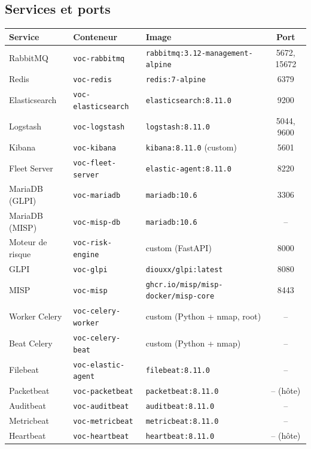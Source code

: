 \documentclass[11pt,a4paper]{article}
\begin{document}
\subsection{Services et ports}

\begin{center}
\small
\begin{longtable}{@{}l l l c@{}}
\toprule
\textbf{Service} & \textbf{Conteneur} & \textbf{Image} & \textbf{Port} \\
\midrule
\endhead
\bottomrule
\endlastfoot
RabbitMQ & \texttt{voc-rabbitmq} & \texttt{rabbitmq:3.12-management-alpine} & 5672, 15672 \\
Redis & \texttt{voc-redis} & \texttt{redis:7-alpine} & 6379 \\
Elasticsearch & \texttt{voc-elasticsearch} & \texttt{elasticsearch:8.11.0} & 9200 \\
Logstash & \texttt{voc-logstash} & \texttt{logstash:8.11.0} & 5044, 9600 \\
Kibana & \texttt{voc-kibana} & \texttt{kibana:8.11.0} (custom) & 5601 \\
Fleet Server & \texttt{voc-fleet-server} & \texttt{elastic-agent:8.11.0} & 8220 \\
MariaDB (GLPI) & \texttt{voc-mariadb} & \texttt{mariadb:10.6} & 3306 \\
MariaDB (MISP) & \texttt{voc-misp-db} & \texttt{mariadb:10.6} & -- \\
Moteur de risque & \texttt{voc-risk-engine} & custom (FastAPI) & 8000 \\
GLPI & \texttt{voc-glpi} & \texttt{diouxx/glpi:latest} & 8080 \\
MISP & \texttt{voc-misp} & \texttt{ghcr.io/misp/misp-docker/misp-core} & 8443 \\
Worker Celery & \texttt{voc-celery-worker} & custom (Python + nmap, root) & -- \\
Beat Celery & \texttt{voc-celery-beat} & custom (Python + nmap) & -- \\
Filebeat & \texttt{voc-elastic-agent} & \texttt{filebeat:8.11.0} & -- \\
Packetbeat & \texttt{voc-packetbeat} & \texttt{packetbeat:8.11.0} & -- (h\^ote) \\
Auditbeat & \texttt{voc-auditbeat} & \texttt{auditbeat:8.11.0} & -- \\
Metricbeat & \texttt{voc-metricbeat} & \texttt{metricbeat:8.11.0} & -- \\
Heartbeat & \texttt{voc-heartbeat} & \texttt{heartbeat:8.11.0} & -- (h\^ote) \\
\bottomrule
\end{longtable}
\end{center}
\end{document}
